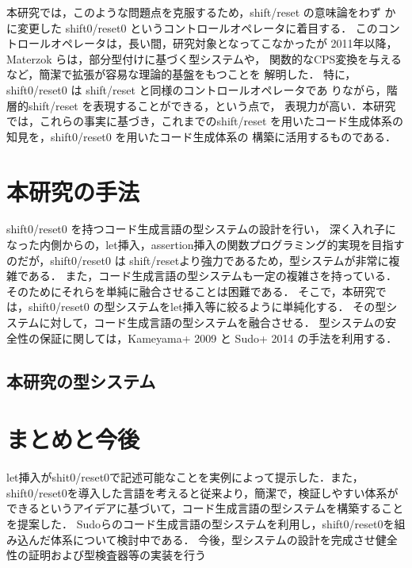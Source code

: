 \documentclass[10pt,a4j,xcolor=dvipsnames,twocolumn]{jarticle}
\theoremstyle{definition}
\begin{document}
本研究では，このような問題点を克服するため，shift/reset の意味論をわず
かに変更した shift0/reset0 というコントロールオペレータに着目する．
このコントロールオペレータは，長い間，研究対象となってこなかったが
2011年以降，Materzok らは，部分型付けに基づく型システムや，
関数的なCPS変換を与えるなど，簡潔で拡張が容易な理論的基盤をもつことを
解明した\cite{Materzok2011,materzok2012}．
特に，shift0/reset0 は shift/reset と同様のコントロールオペレータであ
りながら，階層的shift/reset を表現することができる，という点で，
表現力が高い．本研究では，これらの事実に基づき，これまでのshift/reset
を用いたコード生成体系の知見を，shift0/reset0 を用いたコード生成体系の
構築に活用するものである．

\section{本研究の手法}
shift0/reset0 を持つコード生成言語の型システムの設計を行い，
深く入れ子になった内側からの，let挿入，assertion挿入の関数プログラミング的実現を目指すのだが，shift0/reset0 は shift/resetより強力であるため，型システムが非常に複雑である．
また，コード生成言語の型システムも一定の複雑さを持っている．
そのためにそれらを単純に融合させることは困難である．
そこで，本研究では，shift0/reset0 の型システムをlet挿入等に絞るように単純化する．
その型システムに対して，コード生成言語の型システムを融合させる．
型システムの安全性の保証に関しては，Kameyama+ 2009\cite{Kameyama2009} と Sudo+ 2014\cite{Sudo2014} の手法を利用する．

\subsection{本研究の型システム}


\section{まとめと今後}
let挿入がshit0/reset0で記述可能なことを実例によって提示した．また，shift0/reset0を導入した言語を考えると従来より，簡潔で，検証しやすい体系ができるというアイデアに基づいて，コード生成言語の型システムを構築することを提案した．
Sudoらのコード生成言語の型システム\cite{Sudo2014}を利用し，shift0/reset0を組み込んだ体系について検討中である．
今後，型システムの設計を完成させ健全性の証明および型検査器等の実装を行う



\end{document}

